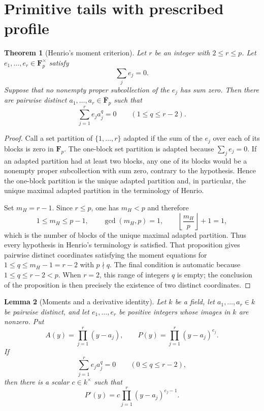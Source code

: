 \documentclass[10pt,a4paper]{amsart}
\newtheorem{theorem}{Theorem}[section]
\newtheorem{lemma}[theorem]{Lemma}
\numberwithin{equation}{section}
\begin{document}
\section{Primitive tails with prescribed profile}

\begin{theorem}[Henrio's moment criterion]\label{thm:henrio-moments}
Let $r$ be an integer with $2\leq r\leq p$.  Let
$e_1,\ldots,e_r\in\mathbf F_p^\times$ satisfy
\[
 \sum_j e_j=0.
\]
Suppose that no nonempty proper subcollection of the
$e_j$ has sum zero.  Then there are pairwise distinct
$a_1,\ldots,a_r\in\overline{\mathbf F}_p$ such that
\begin{equation}\label{eq:henrio-moments}
 \sum_{j=1}^{r}e_j a_j^q=0\qquad(1\leq q\leq r-2).
\end{equation}
\end{theorem}

\begin{proof}
Call a set partition of $\{1,\ldots,r\}$ adapted if the sum of the $e_j$
over each of its blocks is zero in $\mathbf F_p$.  The one-block set
partition is adapted because $\sum_j e_j=0$.  If an adapted partition had
at least two blocks, any one of its blocks would be a nonempty proper
subcollection with sum zero, contrary to the hypothesis.  Hence the
one-block partition is the unique adapted partition and, in particular, the
unique maximal adapted partition in the terminology of Henrio.

Set $m_H=r-1$.  Since $r\leq p$, one has $m_H<p$ and therefore
\[
 1\leq m_H\leq p-1,\qquad \gcd(m_H,p)=1,\qquad
 \left\lfloor\frac{m_H}{p}\right\rfloor+1=1,
\]
which is the number of blocks of the unique maximal adapted partition.
Thus every hypothesis in Henrio's terminology
\cite[Definition~3.14 and Proposition~3.16(b)]{Henrio} is satisfied.
That proposition gives pairwise distinct coordinates satisfying the moment
equations for $1\leq q\leq m_H-1=r-2$ with $p\nmid q$.  The final condition
is automatic because $1\leq q\leq r-2<p$.  When $r=2$, this range of
integers $q$ is empty; the conclusion of the proposition is then precisely
the existence of two distinct coordinates.
\end{proof}

\begin{lemma}[Moments and a derivative identity]
\label{lem:moments-derivative}
Let $k$ be a field, let $a_1,\ldots,a_r\in k$ be pairwise distinct, and let
$e_1,\ldots,e_r$ be positive integers whose images in $k$ are nonzero.  Put
\[
 A(y)=\prod_{j=1}^r(y-a_j),\qquad
 P(y)=\prod_{j=1}^r(y-a_j)^{e_j}.
\]
If
\[
 \sum_{j=1}^r e_ja_j^q=0\qquad(0\leq q\leq r-2),
\]
then there is a scalar $c\in k^\times$ such that
\[
 P'(y)=c\prod_{j=1}^r(y-a_j)^{e_j-1}.
\]
\end{lemma}
\end{document}
